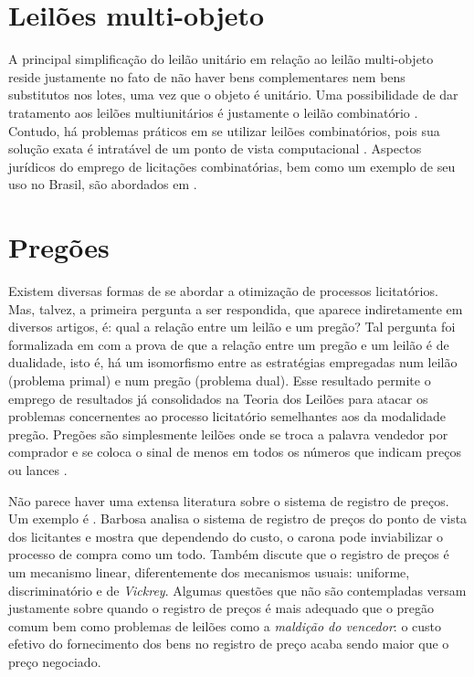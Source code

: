 \section{Leilões multi-objeto}

A principal simplificação do leilão unitário em relação ao leilão multi-objeto reside justamente no fato de não haver bens complementares nem bens substitutos nos lotes, uma vez que o objeto é unitário. Uma possibilidade de dar tratamento aos leilões multiunitários é justamente o leilão combinatório \citet{Shoham2008}. Contudo, há problemas práticos em se utilizar leilões combinatórios, pois sua solução exata é intratável de um ponto de vista computacional \citet{Nisan2007}. Aspectos jurídicos do emprego de licitações combinatórias, bem como um exemplo de seu uso no Brasil, são abordados em \citet{pellegrini2018:MSc}.

\section{Pregões}

Existem diversas formas de se abordar a otimização de processos licitatórios. Mas, talvez, a primeira pergunta a ser respondida, que aparece indiretamente em diversos artigos, é: qual a relação entre um leilão e um pregão? Tal pergunta foi formalizada em \citet{deCastro2010} com a prova de que a relação entre um pregão e um leilão é de dualidade, isto é, há um isomorfismo entre as estratégias empregadas num leilão (problema primal) e num pregão (problema dual). Esse resultado permite o emprego de resultados já consolidados na Teoria dos Leilões para atacar os problemas concernentes ao processo licitatório semelhantes aos da modalidade pregão. Pregões são simplesmente leilões onde se troca a palavra vendedor por comprador e se coloca o sinal de menos em todos os números que indicam preços ou lances \citet{Shoham2008}.

Não parece haver uma extensa literatura sobre o sistema de registro de preços. Um exemplo é \citet{barbosa2013}. Barbosa analisa o sistema de registro de preços do ponto de vista dos licitantes e mostra que dependendo do custo, o carona pode inviabilizar o processo de compra como um todo. Também discute que o registro de preços é um mecanismo linear, diferentemente dos mecanismos usuais: uniforme, discriminatório e de \emph{Vickrey}. Algumas questões que não são contempladas versam justamente sobre quando o registro de preços é mais adequado que o pregão comum bem como problemas de leilões como a \emph{maldição do vencedor}: o custo efetivo do fornecimento dos bens no registro de preço acaba sendo maior que o preço negociado.

